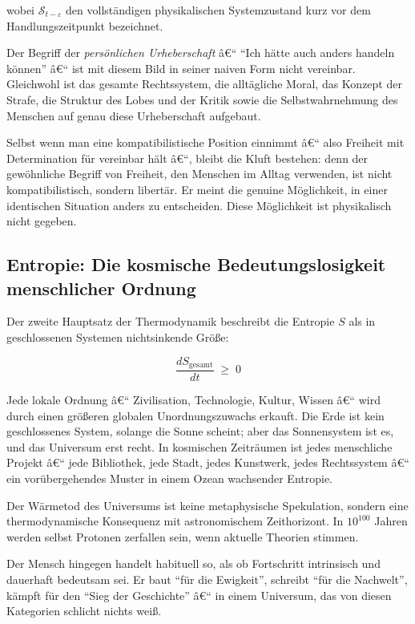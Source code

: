 ﻿\documentclass[12pt, a4paper]{article}
\begin{document}
wobei $\mathcal{S}_{t-\varepsilon}$ den vollständigen physikalischen Systemzustand
kurz vor dem Handlungszeitpunkt bezeichnet.

Der Begriff der \emph{persönlichen Urheberschaft} â€“ \enquote{Ich hätte auch anders
handeln können} â€“ ist mit diesem Bild in seiner naiven Form nicht vereinbar.
Gleichwohl ist das gesamte Rechtssystem, die alltägliche Moral, das Konzept der
Strafe, die Struktur des Lobes und der Kritik sowie die Selbstwahrnehmung des
Menschen auf genau diese Urheberschaft aufgebaut.

Selbst wenn man eine kompatibilistische Position einnimmt â€“ also Freiheit mit
Determination für vereinbar hält â€“, bleibt die Kluft bestehen: denn der gewöhnliche
Begriff von Freiheit, den Menschen im Alltag verwenden, ist nicht kompatibilistisch,
sondern libertär. Er meint die genuine Möglichkeit, in einer identischen Situation
anders zu entscheiden. Diese Möglichkeit ist physikalisch nicht gegeben.

\subsection{Entropie: Die kosmische Bedeutungslosigkeit menschlicher Ordnung}

Der zweite Hauptsatz der Thermodynamik beschreibt die Entropie $S$ als in
geschlossenen Systemen nichtsinkende Größe:

\begin{equation}
  \frac{dS_{\text{gesamt}}}{dt} \;\geq\; 0
\end{equation}

Jede lokale Ordnung â€“ Zivilisation, Technologie, Kultur, Wissen â€“
wird durch einen größeren globalen Unordnungszuwachs erkauft. Die Erde ist kein
geschlossenes System, solange die Sonne scheint; aber das Sonnensystem ist es, und
das Universum erst recht. In kosmischen Zeiträumen ist jedes menschliche Projekt â€“
jede Bibliothek, jede Stadt, jedes Kunstwerk, jedes Rechtssystem â€“
ein vorübergehendes Muster in einem Ozean wachsender Entropie.

Der Wärmetod des Universums ist keine metaphysische Spekulation, sondern eine
thermodynamische Konsequenz mit astronomischem Zeithorizont. In
$10^{100}$ Jahren werden selbst Protonen zerfallen sein, wenn aktuelle
Theorien stimmen.

Der Mensch hingegen handelt habituell so, als ob Fortschritt intrinsisch und
dauerhaft bedeutsam sei. Er baut \enquote{für die Ewigkeit}, schreibt
\enquote{für die Nachwelt}, kämpft für den \enquote{Sieg der Geschichte} â€“
in einem Universum, das von diesen Kategorien schlicht nichts weiß.
\end{document}
